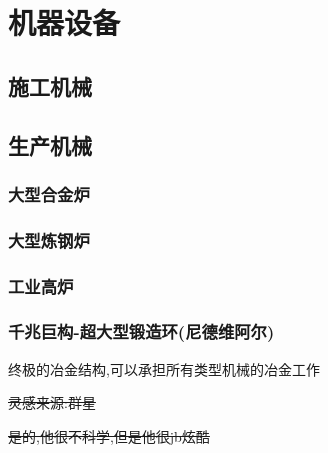 \section{机器设备}{
  \subsection{施工机械}{

  }

  \subsection{生产机械}{
      \subsubsection{大型合金炉}{

      }\label{big_alloy_furnace}

      \subsubsection{大型炼钢炉}{

      }\label{steelmaking_furnace}

      \subsubsection{工业高炉}{

      }\label{industrial_blast_furnace}

      \subsubsection{千兆巨构-超大型锻造环(尼德维阿尔)}{
          终极的冶金结构,可以承担所有类型机械的冶金工作

          \sout{灵感来源:群星}

          \sout{是的,他很不科学,但是他很jb炫酷}
      }\label{megastructure_nidwerl}
  }
 }